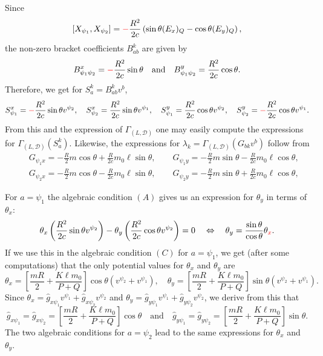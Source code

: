 \documentclass[11pt]{article}
\def\GLD{{\Gamma_{(L,\mathcal{D})}}}
\begin{document}
Since 
\[
[X_{\psi_1},X_{\psi_2}]=\textcolor{red}{-}\frac{R^2}{2c}\left(\sin\theta(E_x)_Q-\cos\theta(E_y)_Q\right),
\]
the non-zero bracket coefficients $B^k_{ab}$  are given by \[
B^x_{\psi_1 \psi_2} =\textcolor{red}{-}\frac{R^2}{2c}\sin\theta \quad\mbox{and}\quad  B^y_{\psi_1 \psi_2} =\frac{R^2}{2c}\cos\theta.
\] 
Therefore, we get   for $S^k_a=B^k_{ab}v^b$,
$$S^x_{\psi_1}=\textcolor{red}{-}\frac{R^2}{2c}\sin\theta v^{\psi_2},\quad S^x_{\psi_2}=\frac{R^2}{2c}\sin\theta v^{\psi_1},\quad  S^y_{\psi_1}=\frac{R^2}{2c}\cos{\theta}v^{\psi_2},\quad S^y_{\psi_2}=\textcolor{red}{-}\frac{R^2}{2c}\cos\theta v^{\psi_1}.$$
From this and the expression of $\GLD$ one may easily compute the expressions for $\GLD(S^k_a)$. Likewise, the expressions for ${\lambda}_k=\GLD(G_{bk}v^b)$ follow from 
\begin{eqnarray*}
&& G_{\psi_1x} = -\frac{R}{2}m\cos\theta + \frac{R}{2c}m_0\ell \sin\theta,\qquad G_{\psi_1y} = -\frac{R}{2}m\sin\theta -\frac{R}{2c}m_0\ell \cos\theta,\\
&& G_{\psi_2x} = -\frac{R}{2}m\cos\theta - \frac{R}{2c}m_0\ell \sin\theta,\qquad G_{\psi_2y} = -\frac{R}{2}m\sin\theta +\frac{R}{2c}m_0\ell \cos\theta,
\end{eqnarray*}
 
For $a=\psi_1$ the algebraic condition $(A)$ gives us an expression for $\theta_y$ in terms of $\theta_x$:  
$$
  \displaystyle  \theta_x\left(\frac{R^2}{2c}\sin\theta v^{\psi_2}\right)-\theta_y\left(\frac{R^2}{2c}\cos\theta v^{\psi_2} \right)=0\quad\Leftrightarrow\quad \theta_y=\frac{\sin\theta}{\cos\theta}\theta_{\textcolor{red}{x}}.$$
 If we use this in the  algebraic condition $(C)$ for $a=\psi_1$, we get (after some computations) that the only potential values for $\theta_x$ and $\theta_y$ are 
  $$
	\theta_x=\left[ \frac{mR}{2}+\frac{K\ell m_0}{P+Q}\right]\cos\theta(v^{\psi_2}+v^{\psi_1}),\quad \theta_y= \left[ \frac{mR}{2}+\frac{K\ell m_0}{P+Q}\right]\sin\theta(v^{\psi_2}+v^{\psi_1}).
	$$
Since $\theta_x=\hat{g}_{x{\psi_1}}v^{\psi_1}+\hat{g}_{x{\psi_2}}v^{\psi_2}$ and $\theta_y=\hat{g}_{y{\psi_1}}v^{\psi_1}+\hat{g}_{y{\psi_2}}v^{\psi_2}$, we derive from this that $$\hat{g}_{x{\psi_1}}=\hat{g}_{x{\psi_2}}=\left[ \frac{mR}{2}+\frac{K\ell m_0}{P+Q}\right]\cos\theta\quad\textrm{and}\quad \hat{g}_{y{\psi_1}}=\hat{g}_{y{\psi_2}}=\left[ \frac{mR}{2}+\frac{K\ell m_0}{P+Q}\right]\sin\theta.  $$  
  The two algebraic conditions for $a=\psi_2$ lead to  the same expressions for $\theta_x$ and $\theta_y$.
	
\end{document}

